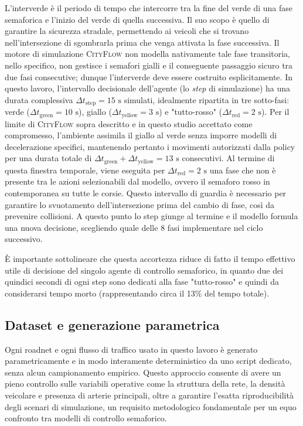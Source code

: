 L'interverde è il periodo di tempo che intercorre tra la fine del verde di una fase semaforica
e l'inizio del verde di quella successiva.
Il suo scopo è quello di garantire la sicurezza stradale, permettendo ai veicoli che si trovano nell'intersezione di
sgombrarla prima che venga attivata la fase successiva.
Il motore di simulazione \textsc{CityFlow} non modella nativamente tale fase transitoria, nello specifico, non gestisce i semafori gialli e il conseguente passaggio sicuro tra due fasi consecutive;
dunque l'interverde deve essere costruito esplicitamente.
In questo lavoro, l'intervallo decisionale dell'agente (lo \emph{step} di simulazione) ha una durata complessiva $\Delta t_{\text{step}} = 15 \text{ s}$ simulati,
idealmente ripartita in tre sotto-fasi:
verde ($\Delta t_{\text{green}} = 10 \text{ s}$), giallo ($\Delta t_{\text{yellow}} = 3 \text{ s}$) e "tutto-rosso" ($\Delta t_{\text{red}} = 2 \text{ s}$).
Per il limite di \textsc{CityFlow} sopra descritto e in questo studio accettato come compromesso, l'ambiente assimila il giallo al verde senza imporre modelli di decelerazione specifici,
mantenendo pertanto i movimenti autorizzati dalla policy per una durata totale di  $\Delta t_{\text{green}}+\Delta t_{\text{yellow}} = 13 \text{ s}$ consecutivi.
Al termine di questa finestra temporale, viene eseguita per $\Delta t_{\text{red}} = 2 \text{ s}$ una fase che non è presente tra le azioni selezionabili dal modello,
ovvero il semaforo rosso in contemporanea su tutte le corsie.
Questo intervallo di guardia è necessario per garantire lo svuotamento dell'intersezione prima del cambio di fase, così da prevenire collisioni.
A questo punto lo step giunge al termine e il modello formula una nuova decisione, scegliendo quale delle 8 fasi implementare nel ciclo successivo.

È importante sottolineare che questa accortezza riduce di fatto il tempo effettivo utile di decisione del singolo agente di controllo semaforico, in quanto due dei quindici secondi di ogni step sono
dedicati alla fase "tutto-rosso" e quindi da considerarsi tempo morto (rappresentando circa il 13\% del tempo totale).

\subsection{Dataset e generazione parametrica}
\label{subsec:dataset}

Ogni roadnet e ogni flusso di traffico usato in questo lavoro è generato
parametricamente e in modo interamente deterministico da uno script dedicato,
senza alcun campionamento empirico.
Questo approccio consente di avere un pieno controllo sulle variabili operative come la
struttura della rete, la densità veicolare e presenza di arterie principali, oltre a
garantire l'esatta riproducibilità degli scenari di simulazione, un requisito metodologico fondamentale
per un equo confronto tra modelli di controllo semaforico.

